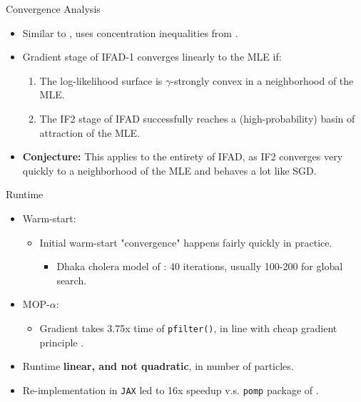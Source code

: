 \documentclass{beamer}
\begin{document}
\begin{frame}{Convergence Analysis}
    \begin{itemize}
        \item Similar to \cite{mahoney16}, uses concentration inequalities from \cite{delmoral11}.
        \item Gradient stage of IFAD-1 converges linearly to the MLE if:
        \begin{enumerate}
            \item \pause The log-likelihood surface is $\gamma$-strongly convex in a neighborhood of the MLE.
            \item \pause The IF2 stage of IFAD successfully reaches a (high-probability) basin of attraction of the MLE. 
        \end{enumerate}
        \item \pause \textbf{Conjecture:} This applies to the entirety of IFAD, as IF2 converges very quickly to a neighborhood of the MLE and behaves a lot like SGD. 
    \end{itemize}
    
\end{frame}


\begin{frame}{Runtime}

\begin{itemize}
    \item Warm-start:
    \begin{itemize}
        \item \pause Initial warm-start "convergence" happens fairly quickly in practice. 
        \begin{itemize}
            \item \pause Dhaka cholera model of \cite{king08}: 40 iterations, usually 100-200 for global search.
        \end{itemize}
    \end{itemize}
    \item \pause MOP-$\alpha$:
    \begin{itemize}
        \item \pause Gradient takes 3.75x time of \texttt{pfilter()}, in line with cheap gradient principle \citep{kakade2019provably}.
    \end{itemize}
    \item \pause Runtime \textbf{linear, and not quadratic}, in number of particles.
    \item \pause Re-implementation in \texttt{JAX} \citep{jax} led to 16x speedup v.s. \texttt{pomp} package of \cite{king08}.
\end{itemize}

\end{frame}
\end{document}
